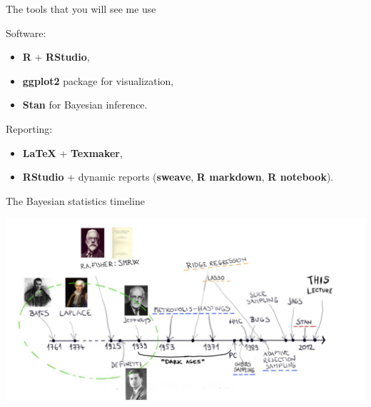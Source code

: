 \begin{frame}{The tools that you will see me use}

Software:
\begin{itemize}
\item \textbf{R} + \textbf{RStudio},
\item \textbf{ggplot2} package for visualization,
\item \textbf{Stan} for Bayesian inference.
\end{itemize}

\bigskip

Reporting:

\begin{itemize}
\item \textbf{LaTeX} + \textbf{Texmaker},
\item \textbf{RStudio} + dynamic reports (\textbf{sweave}, \textbf{R markdown}, \textbf{R notebook}).
\end{itemize}

\end{frame}


\begin{frame}{The Bayesian statistics timeline}
\begin{center}
\includegraphics[width=0.99\linewidth]{../LectureAssets/L00/timeline}
\end{center}
\end{frame}

